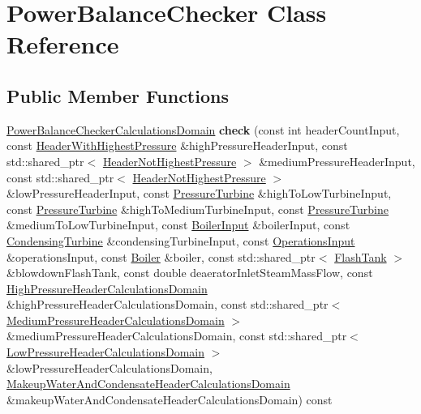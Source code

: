 \hypertarget{class_power_balance_checker}{}\section{Power\+Balance\+Checker Class Reference}
\label{class_power_balance_checker}
\subsection*{Public Member Functions}
\begin{DoxyCompactItemize}
\item 
\mbox{\label{class_power_balance_checker_a05c90282b9728b9c8d647ad0857861c6}} 
\hyperlink{class_power_balance_checker_calculations_domain}{Power\+Balance\+Checker\+Calculations\+Domain} {\bfseries check} (const int header\+Count\+Input, const \hyperlink{class_header_with_highest_pressure}{Header\+With\+Highest\+Pressure} \&high\+Pressure\+Header\+Input, const std\+::shared\+\_\+ptr$<$ \hyperlink{class_header_not_highest_pressure}{Header\+Not\+Highest\+Pressure} $>$ \&medium\+Pressure\+Header\+Input, const std\+::shared\+\_\+ptr$<$ \hyperlink{class_header_not_highest_pressure}{Header\+Not\+Highest\+Pressure} $>$ \&low\+Pressure\+Header\+Input, const \hyperlink{class_pressure_turbine}{Pressure\+Turbine} \&high\+To\+Low\+Turbine\+Input, const \hyperlink{class_pressure_turbine}{Pressure\+Turbine} \&high\+To\+Medium\+Turbine\+Input, const \hyperlink{class_pressure_turbine}{Pressure\+Turbine} \&medium\+To\+Low\+Turbine\+Input, const \hyperlink{class_boiler_input}{Boiler\+Input} \&boiler\+Input, const \hyperlink{class_condensing_turbine}{Condensing\+Turbine} \&condensing\+Turbine\+Input, const \hyperlink{class_operations_input}{Operations\+Input} \&operations\+Input, const \hyperlink{class_boiler}{Boiler} \&boiler, const std\+::shared\+\_\+ptr$<$ \hyperlink{class_flash_tank}{Flash\+Tank} $>$ \&blowdown\+Flash\+Tank, const double deaerator\+Inlet\+Steam\+Mass\+Flow, const \hyperlink{class_high_pressure_header_calculations_domain}{High\+Pressure\+Header\+Calculations\+Domain} \&high\+Pressure\+Header\+Calculations\+Domain, const std\+::shared\+\_\+ptr$<$ \hyperlink{class_medium_pressure_header_calculations_domain}{Medium\+Pressure\+Header\+Calculations\+Domain} $>$ \&medium\+Pressure\+Header\+Calculations\+Domain, const std\+::shared\+\_\+ptr$<$ \hyperlink{class_low_pressure_header_calculations_domain}{Low\+Pressure\+Header\+Calculations\+Domain} $>$ \&low\+Pressure\+Header\+Calculations\+Domain, \hyperlink{class_makeup_water_and_condensate_header_calculations_domain}{Makeup\+Water\+And\+Condensate\+Header\+Calculations\+Domain} \&makeup\+Water\+And\+Condensate\+Header\+Calculations\+Domain) const

\end{DoxyCompactItemize}
